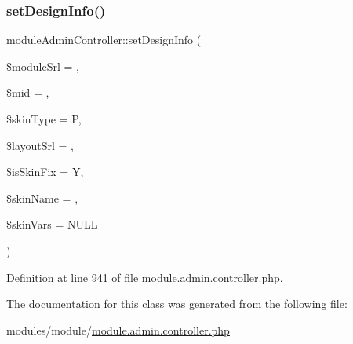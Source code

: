 \subsubsection{\texorpdfstring{set\+Design\+Info()}{setDesignInfo()}}
{\footnotesize\ttfamily module\+Admin\+Controller\+::set\+Design\+Info (\begin{DoxyParamCaption}\item[{}]{\$module\+Srl = {},  }\item[{}]{\$mid = {\ttfamily \textquotesingle{}\textquotesingle{}},  }\item[{}]{\$skin\+Type = {\ttfamily \textquotesingle{}P\textquotesingle{}},  }\item[{}]{\$layout\+Srl = {},  }\item[{}]{\$is\+Skin\+Fix = {\ttfamily \textquotesingle{}Y\textquotesingle{}},  }\item[{}]{\$skin\+Name = {\ttfamily \textquotesingle{}\textquotesingle{}},  }\item[{}]{\$skin\+Vars = {\ttfamily NULL} }\end{DoxyParamCaption})}



Definition at line 941 of file module.\+admin.\+controller.\+php.



The documentation for this class was generated from the following file\+:\begin{DoxyCompactItemize}
\item 
modules/module/\hyperlink{module_8admin_8controller_8php}{module.\+admin.\+controller.\+php}\end{DoxyCompactItemize}
